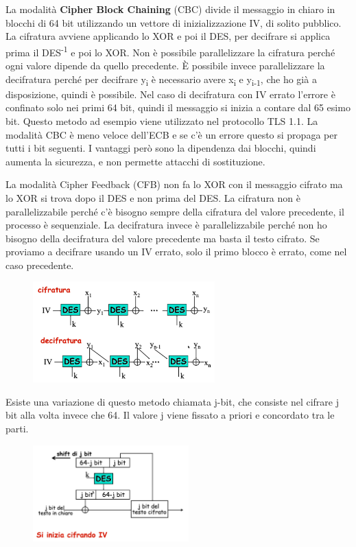 La modalità \textbf{Cipher Block Chaining} (CBC) divide il messaggio in chiaro in blocchi di 64 bit utilizzando un vettore di inizializzazione IV, di solito pubblico. La cifratura avviene applicando lo XOR e poi il DES, per decifrare si applica prima il DES\textsuperscript{-1} e poi lo XOR. Non è possibile parallelizzare la cifratura perché ogni valore dipende da quello precedente. È possibile invece parallelizzare la decifratura perché per decifrare y\textsubscript{i} è necessario avere x\textsubscript{i} e y\textsubscript{i-1}, che ho già a disposizione, quindi è possibile.
Nel caso di decifratura con IV errato l'errore è confinato solo nei primi 64 bit, quindi il messaggio si inizia a contare dal 65 esimo bit. Questo metodo ad esempio viene utilizzato nel protocollo TLS 1.1. La modalità CBC è meno veloce dell'ECB e se c'è un errore questo si propaga per tutti i bit seguenti. I vantaggi però sono la dipendenza dai blocchi, quindi aumenta la sicurezza, e non permette attacchi di sostituzione.

\vspace{5mm}

La modalità Cipher Feedback (CFB) non fa lo XOR con il messaggio cifrato ma lo XOR si trova dopo il DES e non prima del DES. La cifratura non è parallelizzabile perché c'è bisogno sempre della cifratura del valore precedente, il processo è sequenziale. La decifratura invece è parallelizzabile perché non ho bisogno della decifratura del valore precedente ma basta il testo cifrato. Se proviamo a decifrare usando un IV errato, solo il primo blocco è errato, come nel caso precedente.

\begin{figure}[htb!]
    \centering
    \includegraphics[width=7cm]{./Images/cap1/1.7.png}
\end{figure}  

Esiste una variazione di questo metodo chiamata j-bit, che consiste nel cifrare j bit alla volta invece che 64. Il valore j viene fissato a priori e concordato tra le parti.

\begin{figure}[htb!]
    \centering
    \includegraphics[width=6cm]{./Images/cap1/1.8.png}
\end{figure}

